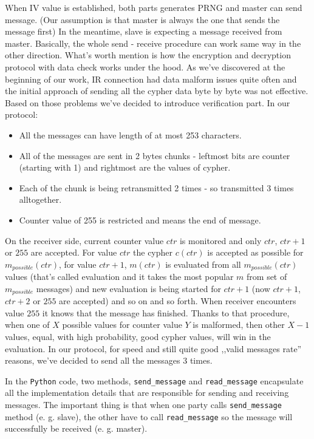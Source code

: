 
When IV value is established, both parts generates PRNG and master can send message. (Our assumption is that master is always the one that sends the message first) In the meantime, slave is expecting a message received from master. Basically, the whole send - receive procedure can work same way in the other direction. What's worth mention is how the encryption and decryption protocol with data check works under the hood. As we've discovered at the beginning of our work, IR connection had data malform issues quite often and the initial approach of sending all the cypher data byte by byte was not effective. Based on those problems we've decided to introduce verification part. In our protocol: 
\begin{itemize}
  \item {All the messages can have length of at most 253 characters.}
  \item {All of the messages are sent in 2 bytes chunks - leftmost bits are counter (starting with 1) and rightmost are the values of cypher.}
  \item {Each of the chunk is being retransmitted 2 times - so transmitted 3 times alltogether. }
  \item { Counter value of 255 is restricted and means the end of message.}
\end{itemize}
On the receiver side, current counter value $ctr$ is monitored and only $ctr$, $ctr+1$ or $255$ are accepted. For value $ctr$ the cypher $c(ctr)$ is accepted as possible for $m_{possible}(ctr)$, for value $ctr+1$, $m(ctr)$ is evaluated from all $m_{possible}(ctr)$ values (that's called evaluation and it takes the most popular $m$ from set of $m_{possible}$ messages) and new evaluation is being started for $ctr+1$ (now $ctr+1$, $ctr+2$ or $255$ are accepted) and so on and so forth. When receiver encounters value $255$ it knows that the message has finished. Thanks to that procedure, when one of $X$ possible values for counter value $Y$ is malformed, then other $X - 1$ values, equal, with high probability, good cypher values, will win in the evaluation. In our protocol, for speed and still quite good ,,valid messages rate'' reasons, we've decided to send all the messages 3 times.

In the \texttt{Python} code, two methods, \texttt{send\_message} and
 \texttt{read\_message} encapsulate all the implementation details that are responsible for sending and receiving messages. The important thing is that when one party calls \texttt{send\_message} method (e. g. slave), the other have to call \texttt{read\_message} so the message will successfully be received (e. g. master).


